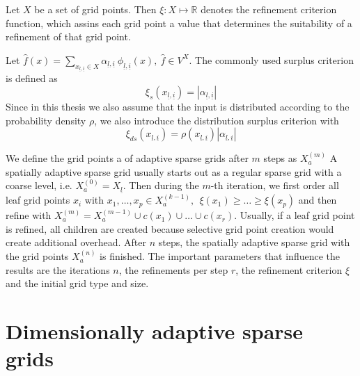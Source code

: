 \documentclass[
  a4paper,  %
  twoside,  %
  bibliography=totoc,
  headsepline,
  cleardoublepage=empty,
  parskip=half,
  draft=false
]{scrbook}
\begin{document}
\begin{definition}
Let $X$ be a set of grid points.
Then $\xi \colon X \mapsto \mathds{R}$ denotes the refinement criterion function, which assins each grid point a value that determines the suitability of a refinement of that grid point.

Let $\hat{f}(x) = \sum_{x_{\underline{l},\underline{i}} \in X} \alpha_{\underline{l},\underline{i}} ~ \phi_{
\underline{l},\underline{i}}(x), ~\hat{f} \in V^X$.
The commonly used surplus criterion is defined as
\begin{equation}
\xi_s(x_{\underline{l},\underline{i}}) = |\alpha_{\underline{l},\underline{i}}|
\end{equation}
Since in this thesis we also assume that the input is distributed according to the probability density $\rho$, we also introduce the distribution surplus criterion with
\begin{equation}
\xi_{ds}(x_{\underline{l},\underline{i}}) =\rho(x_{\underline{l},\underline{i}}) |\alpha_{\underline{l},\underline{i}}|
\end{equation}
\end{definition}
We define the grid points a of adaptive sparse grids after $m$ steps as $X_a^{(m)}$
A spatially adaptive sparse grid usually starts out as a regular sparse grid with a coarse level, i.e. $X_a^{(0)}=X_{\underline{l}}$.
Then during the $m$-th iteration, we first order all leaf grid points $x_i$ with $x_1, \dots, x_p \in X_a^{(k-1)}, ~~ \xi(x_1) \geq \dots \geq \xi(x_p)$ and then refine with $X_a^{(m)}=X_a^{(m-1)} \cup c(x_1) \cup \dots \cup c(x_r)$.
Usually, if a leaf grid point is refined, all children are created because selective grid point creation would create additional overhead.
After $n$ steps, the spatially adaptive sparse grid with the grid points $X_a^{(n)}$ is finished.
The important parameters that influence the results are the iterations $n$, the refinements per step $r$, the refinement criterion $\xi$ and the initial grid type and size.

\section{Dimensionally adaptive sparse grids}
\end{document}
